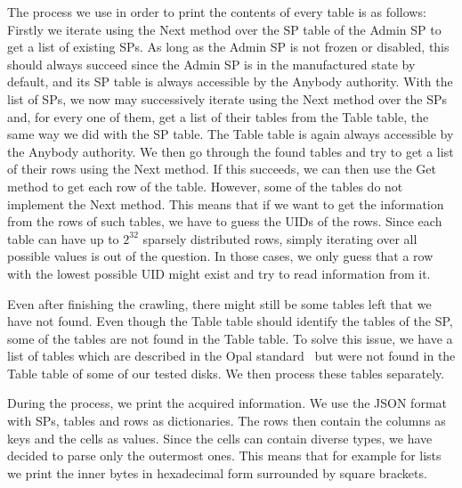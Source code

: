 The process we use in order to print the contents of every table is as follows:
Firstly we iterate using the Next method over the SP table of the Admin SP to get a list of existing SPs. As long as the Admin SP is not frozen or disabled, this should always succeed since the Admin SP is in the manufactured state by default, and its SP table is always accessible by the Anybody authority. 
With the list of SPs, we now may successively iterate using the Next method over the SPs and, for every one of them, get a list of their tables from the Table table, the same way we did with the SP table. The Table table is again always accessible by the Anybody authority.
We then go through the found tables and try to get a list of their rows using the Next method. If this succeeds, we can then use the Get method to get each row of the table. However, some of the tables do not implement the Next method. This means that if we want to get the information from the rows of such tables, we have to guess the UIDs of the rows. Since each table can have up to $2^{32}$ sparsely distributed rows, simply iterating over all possible values is out of the question. In those cases, we only guess that a row with the lowest possible UID might exist and try to read information from it.

Even after finishing the crawling, there might still be some tables left that we have not found. Even though the Table table should identify the tables of the SP, some of the tables are not found in the Table table. To solve this issue, we have a list of tables which are described in the Opal standard~\cite{tcg-opal2} but were not found in the Table table of some of our tested disks. We then process these tables separately.

During the process, we print the acquired information. We use the JSON format with SPs, tables and rows as dictionaries. The rows then contain the columns as keys and the cells as values. Since the cells can contain diverse types, we have decided to 
parse only the outermost ones. This means that for example for lists we print the inner bytes in hexadecimal form surrounded by square brackets.

